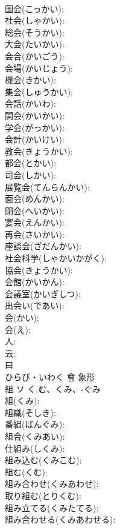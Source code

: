 \documentclass[8pt]{extreport}
\begin{document}
\begin{CJK}{UTF8}{min}
\\	国会(こっかい): 
\\	社会(しゃかい): 
\\	総会(そうかい): 
\\	大会(たいかい): 
\\	会合(かいごう): 
\\	会場(かいじょう): 
\\	機会(きかい): 
\\	集会(しゅうかい): 
\\	会話(かいわ): 
\\	開会(かいかい): 
\\	学会(がっかい): 
\\	会計(かいけい): 
\\	教会(きょうかい): 
\\	都会(とかい): 
\\	司会(しかい): 
\\	展覧会(てんらんかい): 
\\	面会(めんかい): 
\\	閉会(へいかい): 
\\	宴会(えんかい): 
\\	再会(さいかい): 
\\	座談会(ざだんかい): 
\\	社会科学(しゃかいかがく): 
\\	協会(きょうかい): 
\\	会館(かいかん): 
\\	会議室(かいぎしつ): 
\\	出会い(であい): 
\\	会(かい): 
\\	会(え): 
\\	人: 
\\	云: 
\\	曰	
\\	ひらび・いわく	會	象形 
\\	組	ソ	く.む、くみ、-ぐみ		
\\	組(くみ): 
\\	組織(そしき): 
\\	番組(ばんぐみ): 
\\	組合(くみあい): 
\\	仕組み(しくみ): 
\\	組み込む(くみこむ): 
\\	組む(くむ): 
\\	組み合わせ(くみあわせ): 
\\	取り組む(とりくむ): 
\\	組み立てる(くみたてる): 
\\	組み合わせる(くみあわせる): 

\end{CJK}
\end{document}
